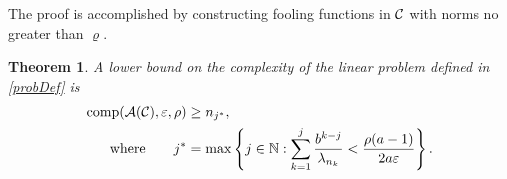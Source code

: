 \documentclass[final]{elsarticle}
\newtheorem{theorem}{Theorem}
\theoremstyle{definition}
\theoremstyle{remark}
\begin{document}
The proof is accomplished by constructing fooling functions in $\mathcal{C}$ with norms no greater than $\varrho$.


\begin{theorem} \label{thm:lowbdcomp}
A lower bound on the complexity of the linear problem defined in \eqref{probDef} is
\begin{subequations} \label{compbd}
\begin{align}
 \label{compbdA}
\operatorname{comp}(\mathcal{A}(\mathcal{C}),\varepsilon,\rho) &\ge n_{j^*},  \\
\label{compbdB}
\text{where} \qquad j^* &= \max \left \{ j \in \mathbb{N} : \sum_{k=1}^j \frac{b^{k-j}}{\lambda_{n_{k}}}   < \frac{\rho(a-1)}{2a \varepsilon}
\right \}.
\end{align}
\end{subequations}
\end{theorem}
\end{document}
